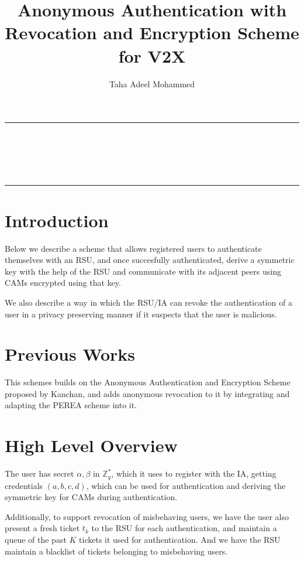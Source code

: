 \documentclass[12pt]{article}
\begin{document}
\title{Anonymous Authentication with Revocation and Encryption Scheme for V2X}
\author{Taha Adeel Mohammed}

\makeatletter
\begin{center}
	\vspace*{-1.8cm}
	\par\noindent\rule{\textwidth}{0.6pt}\\[0.2cm]
	\LARGE{\@title}\\[0.4cm]
	\large{\@author}\\[0.3cm]
	\large{\@date}\\[0cm]
	\par\noindent\rule{\textwidth}{0.6pt}
\end{center}
\makeatother

\section{Introduction}
Below we describe a scheme that allows registered users to authenticate themselves with an RSU, and once succesfully authenticated, derive a symmetric key with the help of the RSU and communicate with its adjacent peers using CAMs encrypted using that key. \\

\par We also describe a way in which the RSU/IA can revoke the authentication of a user in a privacy preserving manner if it suspects that the user is malicious.



\section{Previous Works}
This schemes builds on the Anonymous Authentication and Encryption Scheme proposed by Kanchan\cite*{Kanchan}, and adds anonymous revocation to it by integrating and adapting the PEREA\cite*{perea} scheme into it.



\section{High Level Overview}
The user has secret $\alpha, \beta$ in $\mathbb{Z}_q^*$, which it uses to register with the IA, getting credentials $(a, b, c, d)$, which can be used for authentication and deriving the symmetric key for CAMs during authentication.\\

\par Additionally, to support revocation of misbehaving users, we have the user also present a fresh ticket $t_k$ to the RSU for each authentication, and maintain a queue of the past $K$ tickets it used for authentication. And we have the RSU maintain a blacklist of tickets belonging to misbehaving users. \\
\end{document}
